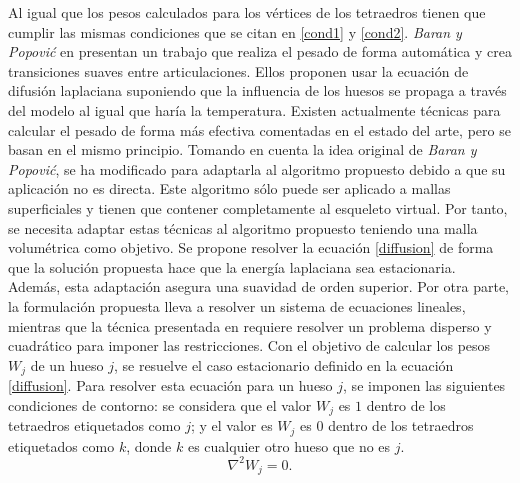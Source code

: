 Al igual que  los pesos calculados para los vértices de los tetraedros tienen que cumplir las mismas condiciones que se citan en \ref{cond1} y \ref{cond2}.
\emph{Baran y Popovi\'{c}} en \cite{Baran:2007} presentan un trabajo que realiza el pesado de forma automática y crea transiciones suaves entre articulaciones. Ellos proponen usar la ecuación de difusión laplaciana suponiendo que la influencia de los huesos se propaga a través del modelo al igual que haría la temperatura. Existen actualmente técnicas para calcular el pesado de forma más efectiva \cite{Jacobson:2011} comentadas en el estado del arte, pero se basan en el mismo principio. Tomando en cuenta la idea original de \emph{Baran y Popovi\'{c}}\cite{Baran:2007}, se ha modificado para adaptarla al algoritmo propuesto debido a que su aplicación no es directa. Este algoritmo  sólo puede ser aplicado a mallas superficiales y tienen que contener completamente al esqueleto virtual. Por tanto, se necesita adaptar estas técnicas al algoritmo propuesto teniendo una malla volumétrica como objetivo. Se propone resolver la ecuación \ref{diffusion} de forma que la solución propuesta hace que la energía laplaciana sea estacionaria. 
Además, esta adaptación asegura una suavidad de orden superior. Por otra parte, la formulación propuesta lleva a resolver un sistema de ecuaciones lineales, mientras que la técnica presentada en \cite{Jacobson:2011} requiere resolver un problema disperso y cuadrático para imponer las restricciones. 
Con el objetivo de calcular los pesos $W_j$ de un hueso $j$, se resuelve el caso estacionario definido en la ecuación \ref{diffusion}. Para resolver esta ecuación para un hueso $j$, se imponen las siguientes condiciones de contorno: se considera que el valor $W_j$ es $1$ dentro de los tetraedros etiquetados como $j$; y el valor es $W_j$ es $0$ dentro de los tetraedros etiquetados como $k$, donde $k$ es cualquier otro hueso que no es $j$.
%
\begin{equation}
\label{diffusion}
\nabla^{2} W_j = 0.
\end{equation}
%

